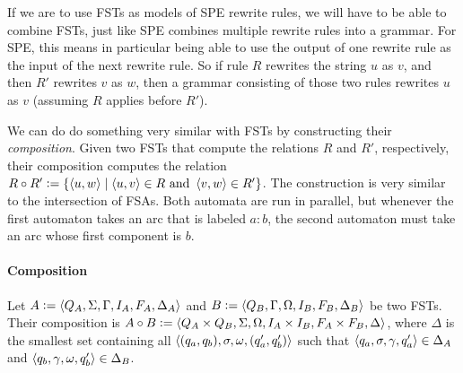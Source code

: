 If we are to use FSTs as models of SPE rewrite rules, we will have to be able to combine FSTs, just like SPE combines multiple rewrite rules into a grammar.
For SPE, this means in particular being able to use the output of one rewrite rule as the input of the next rewrite rule.
So if rule $R$ rewrites the string $u$ as $v$, and then $R'$ rewrites $v$ as $w$, then a grammar consisting of those two rules rewrites $u$ as $v$ (assuming $R$ applies before $R'$).

We can do do something very similar with FSTs by constructing their \emph{composition}.
Given two FSTs that compute the relations $R$ and $R'$, respectively, their composition computes the relation $R \circ R' \mathrel{\mathop:}= \left \{ \left \langle u,w \right \rangle  \mid \left \langle u,v \right \rangle  \in R \text{ and } \left \langle v,w \right \rangle  \in R' \right \}$.
The construction is very similar to the intersection of FSAs.
Both automata are run in parallel, but whenever the first automaton takes an arc that is labeled $a:b$, the second automaton must take an arc whose first component is $b$.

\paragraph{Composition}
Let $A \mathrel{\mathop:}= \left \langle Q_A, \Sigma, \Gamma, I_A, F_A, \Delta_A \right \rangle $ and $B \mathrel{\mathop:}= \left \langle Q_B, \Gamma, \Omega, I_B, F_B, \Delta_B \right \rangle $ be two FSTs.
Their composition is $A \circ B \mathrel{\mathop:}= \left \langle Q_A \times Q_B, \Sigma, \Omega, I_A \times I_B, F_A \times F_B, \Delta \right \rangle $, where $\Delta$ is the smallest set containing all $\left \langle (q_a,q_b),\sigma,\omega,(q_a',q_b') \right \rangle $ such that $\left \langle q_a,\sigma,\gamma,q_a' \right \rangle  \in \Delta_A$ and $\left \langle q_b,\gamma,\omega,q_b' \right \rangle  \in \Delta_B$.

